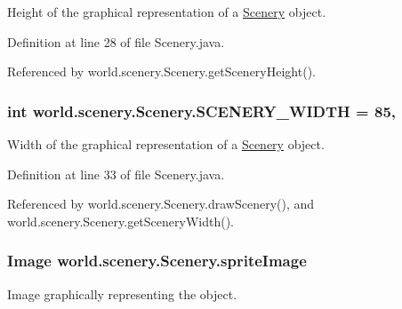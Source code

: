 Height of the graphical representation of a \hyperlink{classworld_1_1scenery_1_1_scenery}{Scenery} object. 



Definition at line 28 of file Scenery.\-java.



Referenced by world.\-scenery.\-Scenery.\-get\-Scenery\-Height().

\hypertarget{classworld_1_1scenery_1_1_scenery_affb047c028883c6d069a03ef0f1caeb8}{
\subsubsection[{S\-C\-E\-N\-E\-R\-Y\-\_\-\-W\-I\-D\-T\-H}]{\setlength{\rightskip}{0pt plus 5cm}int world.\-scenery.\-Scenery.\-S\-C\-E\-N\-E\-R\-Y\-\_\-\-W\-I\-D\-T\-H = 85\hspace{0.3cm}{\ttfamily [static]}, {\ttfamily [protected]}}}\label{classworld_1_1scenery_1_1_scenery_affb047c028883c6d069a03ef0f1caeb8}


Width of the graphical representation of a \hyperlink{classworld_1_1scenery_1_1_scenery}{Scenery} object. 



Definition at line 33 of file Scenery.\-java.



Referenced by world.\-scenery.\-Scenery.\-draw\-Scenery(), and world.\-scenery.\-Scenery.\-get\-Scenery\-Width().

\hypertarget{classworld_1_1scenery_1_1_scenery_a512d9c0a154e6843389e343d80843326}{
\subsubsection[{sprite\-Image}]{\setlength{\rightskip}{0pt plus 5cm}Image world.\-scenery.\-Scenery.\-sprite\-Image\hspace{0.3cm}{\ttfamily [protected]}}}\label{classworld_1_1scenery_1_1_scenery_a512d9c0a154e6843389e343d80843326}


Image graphically representing the object. 



